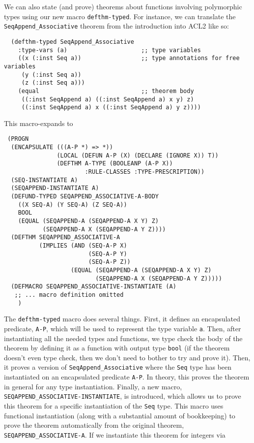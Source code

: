 \documentclass[]{eptcs}
\begin{document}
We can also state (and prove) theorems about functions involving polymorphic types using our new macro \verb|defthm-typed|. For instance, we can translate the \verb|SeqAppend_Associative| theorem from the introduction into ACL2 like so:
\begin{verbatim}
  (defthm-typed SeqAppend_Associative
    :type-vars (a)                     ;; type variables
    ((x (:inst Seq a))                 ;; type annotations for free variables
     (y (:inst Seq a))
     (z (:inst Seq a)))
    (equal                             ;; theorem body
     ((:inst SeqAppend a) ((:inst SeqAppend a) x y) z)   
     ((:inst SeqAppend a) x ((:inst SeqAppend a) y z))))
\end{verbatim}
This macro-expands to
\begin{verbatim}
 (PROGN
  (ENCAPSULATE (((A-P *) => *))
               (LOCAL (DEFUN A-P (X) (DECLARE (IGNORE X)) T))
               (DEFTHM A-TYPE (BOOLEANP (A-P X))
                       :RULE-CLASSES :TYPE-PRESCRIPTION))
  (SEQ-INSTANTIATE A)
  (SEQAPPEND-INSTANTIATE A)
  (DEFUND-TYPED SEQAPPEND_ASSOCIATIVE-A-BODY
    ((X SEQ-A) (Y SEQ-A) (Z SEQ-A))
    BOOL
    (EQUAL (SEQAPPEND-A (SEQAPPEND-A X Y) Z)
           (SEQAPPEND-A X (SEQAPPEND-A Y Z))))
  (DEFTHM SEQAPPEND_ASSOCIATIVE-A
          (IMPLIES (AND (SEQ-A-P X)
                        (SEQ-A-P Y)
                        (SEQ-A-P Z))
                   (EQUAL (SEQAPPEND-A (SEQAPPEND-A X Y) Z)
                          (SEQAPPEND-A X (SEQAPPEND-A Y Z)))))
  (DEFMACRO SEQAPPEND_ASSOCIATIVE-INSTANTIATE (A)
   ;; ... macro definition omitted
    )
\end{verbatim}
The \verb|defthm-typed| macro does several things. First, it defines an encapsulated predicate, \verb|A-P|, which will be used to represent the type variable \verb|a|. Then, after instantiating all the needed types and functions, we type check the body of the theorem by defining it as a function with output type \verb|bool| (if the theorem doesn't even type check, then we don't need to bother to try and prove it). Then, it proves a version of \verb|SeqAppend_Associative| where the \verb|Seq| type has been instantiated on an encapsulated predicate \verb|A-P|. In theory, this proves the theorem in general for any type instantiation. Finally, a new macro, \verb|SEQAPPEND_ASSOCIATIVE-INSTANTIATE|, is introduced, which allows us to prove this theorem for a specific instantiation of the \verb|Seq| type. This macro uses functional instantiation (along with a substantial amount of bookkeeping) to prove the theorem automatically from the original theorem, \verb|SEQAPPEND_ASSOCIATIVE-A|. If we instantiate this theorem for integers via
\end{document}
